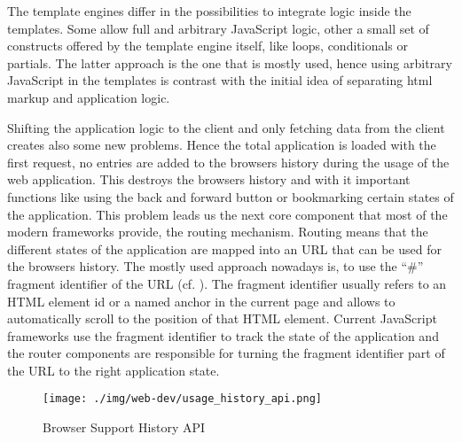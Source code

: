 The template engines differ in the possibilities to integrate logic inside the templates.
Some allow full and arbitrary JavaScript logic, other a small set of constructs offered by the template engine itself, like loops, conditionals or partials.
The latter approach is the one that is mostly used, hence using arbitrary JavaScript in the templates is contrast with the initial idea of separating html markup and application logic.

Shifting the application logic to the client and only fetching data from the client creates also some new problems.
Hence the total application is loaded with the first request, no entries are added to the browsers history during the usage of the web application.
This destroys the browsers history and with it  important functions like using the back and forward button or bookmarking certain states of the application.
This problem leads us  the next core component that most of the modern frameworks provide, the routing mechanism.
Routing means that the different states of the application are mapped into an URL that can be used for the browsers history.
The mostly used approach nowadays is, to use the \enquote{\#} fragment identifier of the URL (cf. \autocite{spi_manifesto}).
The fragment identifier usually refers to an HTML element id or a named anchor in the current page and allows to automatically scroll to the position of that HTML element.
Current JavaScript frameworks use the fragment identifier to track the state of the application and the router components are responsible for turning the fragment identifier part of the URL to the right application state.

\begin{figure}
	\centering \texttt{[image: ./img/web-dev/usage\_history\_api.png]}
	\caption{Browser Support History API \autocite{can_i_use}}
	\label{fig:usage_history_api}
\end{figure}

